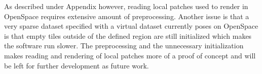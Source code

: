 As described under Appendix  however, reading local patches used to render in OpenSpace requires extensive amount of preprocessing. Another issue is that a very sparse dataset specified with a virtual dataset  currently poses on OpenSpace is that empty tiles outside of the defined region are still initialized which makes the software run slower. The preprocessing and the unnecessary initialization makes reading and rendering of local patches more of a proof of concept and will be left for further development as future work.